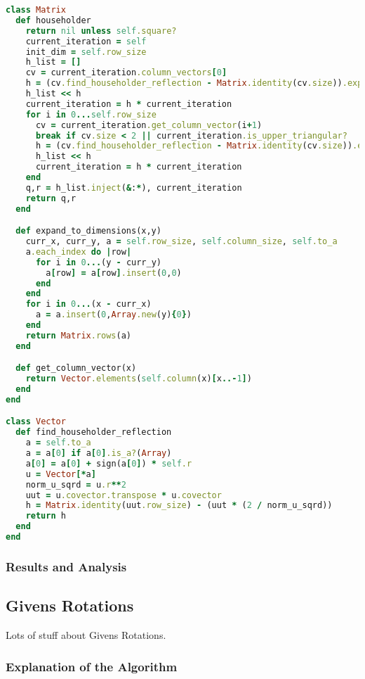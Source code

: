 \documentclass[letterpaper,12pt]{article}
\begin{document}
\lstset{caption=QR Decomposition via Householder Reflections}
\begin{lstlisting}[language=ruby]
class Matrix
  def householder
    return nil unless self.square?
    current_iteration = self
    init_dim = self.row_size
    h_list = []
    cv = current_iteration.column_vectors[0]
    h = (cv.find_householder_reflection - Matrix.identity(cv.size)).expand_to_dimensions(init_dim,init_dim) + Matrix.identity(init_dim)
    h_list << h
    current_iteration = h * current_iteration
    for i in 0...self.row_size
      cv = current_iteration.get_column_vector(i+1)
      break if cv.size < 2 || current_iteration.is_upper_triangular?
      h = (cv.find_householder_reflection - Matrix.identity(cv.size)).expand_to_dimensions(init_dim,init_dim) + Matrix.identity(init_dim)
      h_list << h
      current_iteration = h * current_iteration
    end
    q,r = h_list.inject(&:*), current_iteration
    return q,r
  end

  def expand_to_dimensions(x,y)
    curr_x, curr_y, a = self.row_size, self.column_size, self.to_a
    a.each_index do |row|
      for i in 0...(y - curr_y)
        a[row] = a[row].insert(0,0)
      end
    end
    for i in 0...(x - curr_x)
      a = a.insert(0,Array.new(y){0})
    end
    return Matrix.rows(a)
  end

  def get_column_vector(x)
    return Vector.elements(self.column(x)[x..-1])
  end
end

class Vector
  def find_householder_reflection
    a = self.to_a
    a = a[0] if a[0].is_a?(Array)
    a[0] = a[0] + sign(a[0]) * self.r
    u = Vector[*a]
    norm_u_sqrd = u.r**2
    uut = u.covector.transpose * u.covector
    h = Matrix.identity(uut.row_size) - (uut * (2 / norm_u_sqrd))
    return h
  end
end
\end{lstlisting}

\subsubsection{Results and Analysis}

\subsection{Givens Rotations}

Lots of stuff about Givens Rotations.

\subsubsection{Explanation of the Algorithm}
\end{document}
